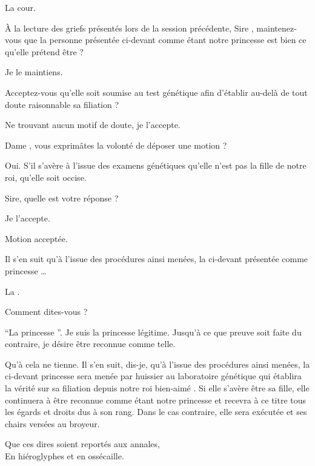 \begin{drama}

  \huissierspeaks La cour.

  \nobleOnespeaks À la lecture des griefs présentés lors de la session précédente, Sire \roi, maintenez-vous que la personne présentée ci-devant comme étant notre princesse \princesse{} est bien ce qu’elle prétend être ?

  \roispeaks Je le maintiens.

  \nobleTwospeaks Acceptez-vous qu’elle soit soumise au test génétique afin d’établir au-delà de tout doute raisonnable sa filiation ?

  \roispeaks Ne trouvant aucun motif de doute, je l’accepte.

  \nobleTreespeaks Dame \reine{}, vous exprimâtes la volonté de déposer une motion ?

  \reinespeaks Oui. S’il s’avère à l’issue des examens génétiques qu’elle n’est pas la fille de notre roi, qu’elle soit occise.

  \nobleOnespeaks Sire, quelle est votre réponse ?

  \roispeaks Je l’accepte.

   Motion acceptée.

  \nobleOnespeaks Il s’en suit qu’à l’issue des procédures ainsi menées, la ci-devant présentée comme  princesse \princesse{}…

  \elaspeaks La .

  \nobleOnespeaks Comment dites-vous ?

  \elaspeaks \enquote{La  princesse \princesse{}}. Je suis la princesse légitime. Jusqu’à ce que preuve soit faite du contraire, je désire être reconnue comme telle.

  \nobleOnespeaks Qu’à cela ne tienne. Il s’en suit, dis-je, qu’à l’issue des procédures ainsi menées, la ci-devant    princesse \princesse{} sera menée par huissier au laboratoire génétique qui établira la vérité sur sa filiation depuis notre roi bien-aimé \roi. Si elle s’avère être sa fille, elle continuera à être reconnue comme étant notre princesse \princesse{} et recevra à ce titre tous les égards et droits dus à son rang. Dans le cas contraire, elle sera exécutée et ses chairs versées au broyeur.

  \begin{minipage}[t]{\linewidth}
    Que ces dires soient reportés aux annales,\\
    En hiéroglyphes et en ossécaille.
  \end{minipage}
\end{drama}

